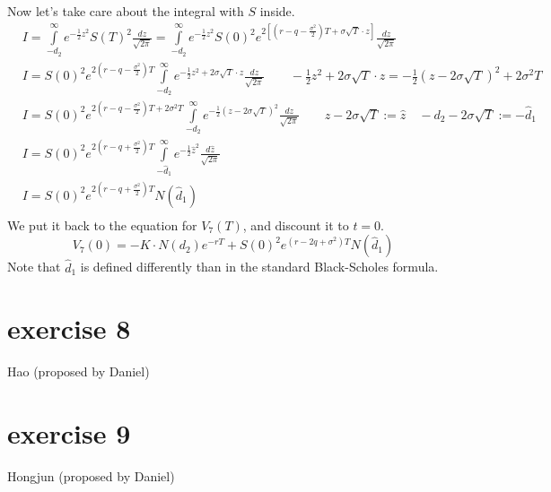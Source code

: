\documentclass{article}
\begin{document}
Now let's take care about the integral with $S$ inside.
\begin{align}
     & I=\int\limits_{-{{d}_{2}}}^{\infty }{{{e}^{-\frac{1}{2}{{z}^{2}}}}S{{\left( T \right)}^{2}}\frac{dz}{\sqrt{2\pi }}}=\int\limits_{-{{d}_{2}}}^{\infty }{{{e}^{-\frac{1}{2}{{z}^{2}}}}S{{\left( 0 \right)}^{2}}{{e}^{2\left[ \left( r-q-\frac{{{\sigma }^{2}}}{2} \right)T+\sigma \sqrt{T}\cdot z \right]}}\frac{dz}{\sqrt{2\pi }}} \\
     & I=S{{\left( 0 \right)}^{2}}{{e}^{2\left( r-q-\frac{{{\sigma }^{2}}}{2} \right)T}}\int\limits_{-{{d}_{2}}}^{\infty }{{{e}^{-\frac{1}{2}{{z}^{2}}+2\sigma \sqrt{T}\cdot z}}\frac{dz}{\sqrt{2\pi }}}\qquad -\frac{1}{2}{{z}^{2}}+2\sigma \sqrt{T}\cdot z=-\frac{1}{2}{{\left( z-2\sigma \sqrt{T} \right)}^{2}}+2{{\sigma }^{2}}T     \\
     & I=S{{\left( 0 \right)}^{2}}{{e}^{2\left( r-q-\frac{{{\sigma }^{2}}}{2} \right)T+2{{\sigma }^{2}}T}}\int\limits_{-{{d}_{2}}}^{\infty }{{{e}^{-\frac{1}{2}{{\left( z-2\sigma \sqrt{T} \right)}^{2}}}}\frac{dz}{\sqrt{2\pi }}}\qquad z-2\sigma \sqrt{T}:=\hat{z}\quad -{{d}_{2}}-2\sigma \sqrt{T}:=-{{{\hat{d}}}_{1}}                \\
     & I=S{{\left( 0 \right)}^{2}}{{e}^{2\left( r-q+\frac{{{\sigma }^{2}}}{2} \right)T}}\int\limits_{-{{{\hat{d}}}_{1}}}^{\infty }{{{e}^{-\frac{1}{2}{{{\hat{z}}}^{2}}}}\frac{d\hat{z}}{\sqrt{2\pi }}}                                                                                                                                   \\
     & I=S{{\left( 0 \right)}^{2}}{{e}^{2\left( r-q+\frac{{{\sigma }^{2}}}{2} \right)T}}N\left( {{{\hat{d}}}_{1}} \right)                                                                                                                                                                                                                \\
\end{align}
We put it back to the equation for $V_7(T)$, and discount it to $t=0$.
\[{{V}_{7}}\left( 0 \right)=-K\cdot N\left( {{d}_{2}} \right) e^{-rT} +S{{\left( 0 \right)}^{2}}{{e}^{\left( r - 2q + {\sigma }^{2} \right)T}}N\left( {{{\hat{d}}}_{1}} \right)\]
Note that $\hat{d}_1$ is defined differently than in the standard Black-Scholes formula.
\section*{exercise 8}
Hao (proposed by Daniel)

\section*{exercise 9}
Hongjun (proposed by Daniel)
\end{document}
